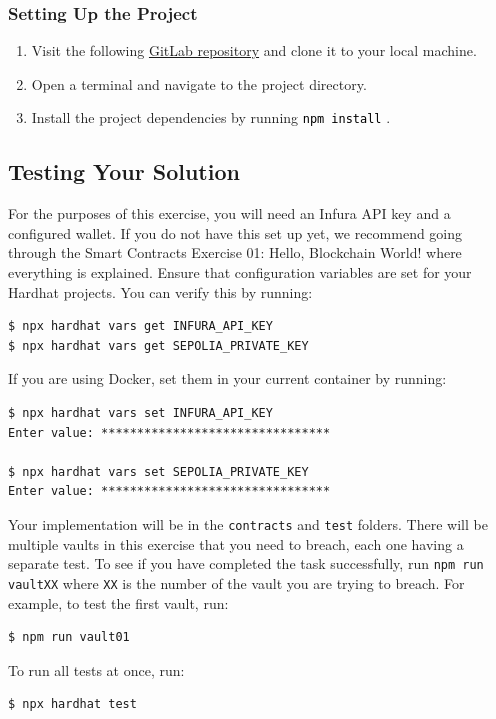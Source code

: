 \documentclass[12pt]{article}
\newcommand{\codegrey}[1]{%
  \texttt{\colorbox{black!4}{\textcolor{black}{#1}}}%
}
\begin{document}
\subsubsection*{Setting Up the Project}

\begin{enumerate}
    \item Visit the following \href{https://gitlab.fel.cvut.cz/radovluk/smart-contracts-exercises/-/tree/main/04-Unbreakable-Vault/task/task-code}{GitLab repository} and clone it to your local machine.
    \item Open a terminal and navigate to the project directory.
    \item Install the project dependencies by running \codegrey{npm install}.
\end{enumerate}

\subsection{Testing Your Solution}

For the purposes of this exercise, you will need an Infura API key and a configured wallet. If you do not have this set up yet, we recommend going through the Smart Contracts Exercise 01: Hello, Blockchain World! where everything is explained. Ensure that configuration variables are set for your Hardhat projects.
You can verify this by running:

\begin{verbatim}
$ npx hardhat vars get INFURA_API_KEY
$ npx hardhat vars get SEPOLIA_PRIVATE_KEY
\end{verbatim}

\noindent
If you are using Docker, set them in your current container by running:

\begin{verbatim}
$ npx hardhat vars set INFURA_API_KEY
Enter value: ********************************

$ npx hardhat vars set SEPOLIA_PRIVATE_KEY
Enter value: ********************************
\end{verbatim}

Your implementation will be in the \texttt{contracts} and \texttt{test} folders.
There will be multiple vaults in this exercise that you need to breach, each one having a separate test. To see if you have completed the task successfully, run \texttt{npm run vaultXX} where \texttt{XX} is the number of the vault you are trying to breach. For example, to test the first vault, run:
\begin{verbatim}
$ npm run vault01
\end{verbatim}
To run all tests at once, run:
\begin{verbatim}
$ npx hardhat test
\end{verbatim}
\end{document}
